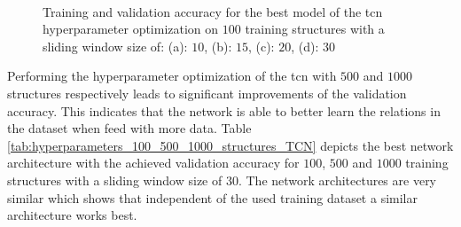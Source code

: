 \documentclass[conference]{IEEEtran}
\begin{document}
\begin{figure}[htp]
	\centering
	\quad
	\\
	\quad
	\caption{Training and validation accuracy for the best model of the \gls{tcn} hyperparameter optimization on $ 100 $ training structures with a sliding window size of: (a): $ 10 $, (b): $ 15 $, (c): $ 20 $, (d): $ 30 $}
	\label{fig:accuracy_100_structures_random_search_tcn}
\end{figure}

Performing the hyperparameter optimization of the \gls{tcn} with $ 500 $ and $ 1000 $ structures respectively leads to significant improvements of the validation accuracy. This indicates that the network is able to better learn the relations in the dataset when feed with more data. Table \ref{tab:hyperparameters_100_500_1000_structures_TCN} depicts the best network architecture with the achieved validation accuracy for $ 100 $, $ 500 $ and $ 1000 $ training structures with a sliding window size of $ 30 $. The network architectures are very similar which shows that independent of the used training dataset a similar architecture works best.
\end{document}
